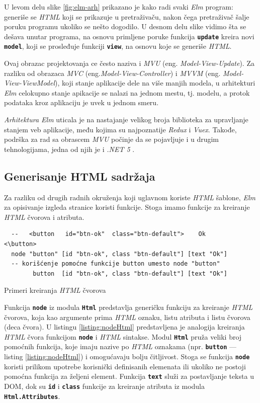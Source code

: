 \documentclass[12pt,oneside]{memoir}
\begin{document}
U levom delu slike \ref{fig:elm-arh} prikazano je kako radi svaki \emph{Elm} program: generiše
se \emph{HTML} koji se prikazuje u pretraživaču, nakon čega pretraživač šalje poruku programu
ukoliko se nešto dogodilo. U desnom delu slike vidimo šta se dešava unutar programa,
na osnovu primljene poruke funkcija \texttt{\textbf{update}} kreira novi\texttt{
\textbf{model}}, koji se prosleđuje funkciji \texttt{\textbf{view}}, na osnovu koje
se generiše \emph{HTML}.

Ovaj obrazac projektovanja ce često naziva i \emph{MVU} (eng. \emph{Model-View-Update}). Za 
razliku od obrazaca \emph{MVC} \cite{jsPatterns} (eng.\emph{Model-View-Controller}) i \emph{MVVM} \cite{jsPatterns}
(eng. \emph{Model-View-ViewModel}), koji stanje aplikacije dele na više manjih modela,
u arhitekturi \emph{Elm} celokupno stanje apikacije se nalazi na jednom mestu, tj. modelu, a
protok podataka kroz aplikaciju je uvek u jednom smeru. 

\emph{Arhitektura Elm} uticala je na nastajanje velikog broja biblioteka za upravljanje
stanjem veb aplikacije, među kojima su najpoznatije \emph{Redux}\cite{redux} i \emph{Vuex}\cite{vuex}.
Takođe, podrška za rad sa obrascem \emph{MVU} počinje da se pojavljuje i u drugim tehnologijama,
jedna od njih je i \emph{.NET 5} \cite{net5}.

\subsection{Generisanje HTML sadržaja}
Za razliku od drugih radnih okruženja koji uglavnom koriste \emph{HTML} šablone, \emph{Elm} za 
opisivanje izgleda stranice koristi funkcije. Stoga imamo funkcije za kreiranje \emph{HTML}
čvorova i atributa.
\begin{listing}[h]
  \begin{verbatim}
  --   <button   id="btn-ok"  class="btn-default">    Ok      <\button>
  node "button" [id "btn-ok", class "btn-default"] [text "Ok"]
  -- korišćenje pomoćne funkcije button umesto node "button"
        button  [id "btn-ok", class "btn-default"] [text "Ok"]
  \end{verbatim}
  \caption{Primeri kreiranja \emph{HTML} čvorova}
  \label{listing:nodeHtml}
  \end{listing}
  
Funkcija \texttt{\textbf{node}} iz modula \texttt{\textbf{Html}} predstavlja generičku
funkciju za kreiranje \emph{HTML} čvorova, koja kao argumente prima \emph{HTML} oznaku, listu atributa
i listu čvorova (deca čvora). U listingu \ref{listing:nodeHtml} predstavljena je analogija
kreiranja \emph{HTML} čvora funkcijom \texttt{\textbf{node}} i \emph{HTML} sintakse.
Modul \texttt{\textbf{Html}} pruža veliki broj pomoćnih funkcija, koje imaju nazive po
\emph{HTML} oznakama (npr. \texttt{\textbf{button}} --- listing \ref{listing:nodeHtml}) i omogućavaju bolju čitljivost. Stoga se 
funkcija \texttt{\textbf{node}} koristi prilikom upotrebe korisnički definisanih elemenata
ili ukoliko ne postoji pomoćna funkcija za željeni element. Funkcija \texttt{\textbf{text}}
služi za postavljanje teksta u DOM, dok su \texttt{\textbf{id}} i \texttt{\textbf{class}}
funkcije za kreiranje atributa iz modula \texttt{\textbf{Html.Attributes}}.
\end{document}
